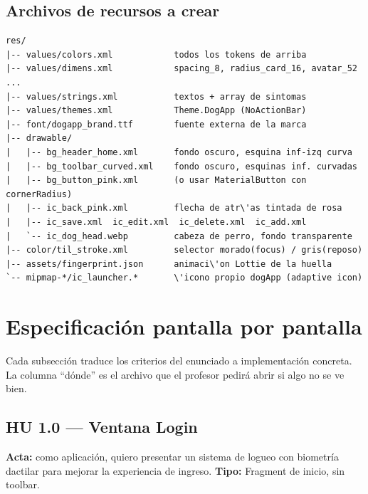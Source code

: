 \documentclass[11pt,letterpaper]{article}
\begin{document}
\subsection{Archivos de recursos a crear}

\begin{verbatim}
res/
|-- values/colors.xml            todos los tokens de arriba
|-- values/dimens.xml            spacing_8, radius_card_16, avatar_52 ...
|-- values/strings.xml           textos + array de sintomas
|-- values/themes.xml            Theme.DogApp (NoActionBar)
|-- font/dogapp_brand.ttf        fuente externa de la marca
|-- drawable/
|   |-- bg_header_home.xml       fondo oscuro, esquina inf-izq curva
|   |-- bg_toolbar_curved.xml    fondo oscuro, esquinas inf. curvadas
|   |-- bg_button_pink.xml       (o usar MaterialButton con cornerRadius)
|   |-- ic_back_pink.xml         flecha de atr\'as tintada de rosa
|   |-- ic_save.xml  ic_edit.xml  ic_delete.xml  ic_add.xml
|   `-- ic_dog_head.webp         cabeza de perro, fondo transparente
|-- color/til_stroke.xml         selector morado(focus) / gris(reposo)
|-- assets/fingerprint.json      animaci\'on Lottie de la huella
`-- mipmap-*/ic_launcher.*       \'icono propio dogApp (adaptive icon)
\end{verbatim}

\section{Especificaci\'on pantalla por pantalla}
\label{sec:pantallas}

Cada subsecci\'on traduce los criterios del enunciado a implementaci\'on concreta.
La columna ``d\'onde'' es el archivo que el profesor pedir\'a abrir si algo no se
ve bien.

\subsection{HU 1.0 --- Ventana Login}

\textbf{Acta:} como aplicaci\'on, quiero presentar un sistema de logueo con
biometr\'ia dactilar para mejorar la experiencia de ingreso. \textbf{Tipo:}
Fragment de inicio, sin toolbar.
\end{document}
